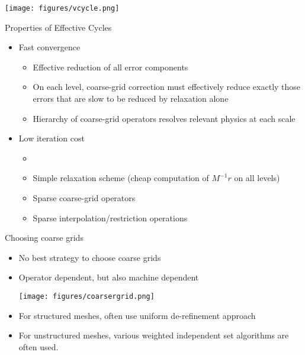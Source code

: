 \begin{frame}
\texttt{[image: figures/vcycle.png]}
\end{frame}

\begin{frame}{Properties of Effective Cycles}
  \begin{itemize}
  \item   Fast convergence
    \begin{itemize}
    \item  Effective reduction of all error components
      \item  On each level, coarse-grid correction must effectively
reduce exactly those errors that are slow to be reduced
by relaxation alone
\item Hierarchy of coarse-grid operators resolves relevant
physics at each scale

    \end{itemize}
  \item Low iteration cost
    \begin{itemize}
    \item \item Simple relaxation scheme (cheap computation of $M^{-1}r$
on all levels)
\item Sparse coarse-grid operators
\item Sparse interpolation/restriction operations

    \end{itemize}

  \end{itemize}
\end{frame}

\begin{frame}{Choosing coarse grids}
  \begin{itemize}
  \item   No best strategy to choose coarse grids
  \item Operator dependent, but also machine dependent

    \texttt{[image: figures/coarsergrid.png]}

\item For structured meshes, often use uniform de-refinement
approach
\item For unstructured meshes, various weighted independent set
algorithms are often used.

  \end{itemize}
\end{frame}

